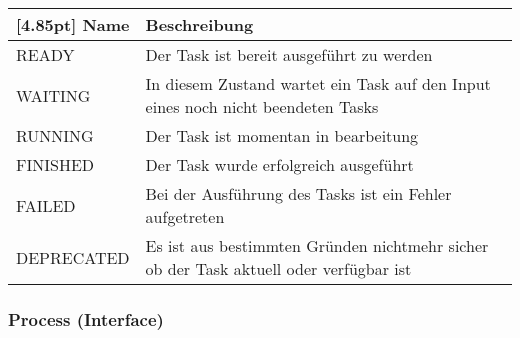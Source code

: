 			\begin{center}
            	\renewcommand{\arraystretch}{1.5}
	            \setlength\tabcolsep{5pt}
            	\begin{tabularx}{\textwidth}{|l|X|}
            		\hline
                    \rowcolor[gray]{0.75}[4.85pt]
            	    Name & Beschreibung \\ \hline
            	    READY & Der Task ist bereit ausgeführt zu werden \\ \hline
            		WAITING & In diesem Zustand wartet ein Task auf den Input eines noch nicht beendeten Tasks \\ \hline
            		RUNNING & Der Task ist momentan in bearbeitung \\ \hline
            		FINISHED & Der Task wurde erfolgreich ausgeführt \\ \hline
            		FAILED & Bei der Ausführung des Tasks ist ein Fehler aufgetreten \\ \hline
            		DEPRECATED & Es ist aus bestimmten Gründen nichtmehr sicher ob der Task aktuell oder verfügbar ist\\ \hline
				\end{tabularx}
			\end{center}
                
    		\subsubsection{Process (Interface)}
    		
